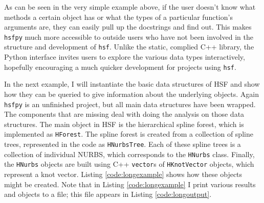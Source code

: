   \vspace{.2in}
  
  \mainstretch{}

  As can be seen in the very simple example above, if the user doesn't know what methods a certain object has or what the types of a particular function's arguments are, they can easily pull up the docstrings and find out. This makes \texttt{hsfpy} much more accessible to outside users who have not been involved in the structure and development of \texttt{hsf}. Unlike  the static, complied C++ library, the Python interface invites users to explore the various data types interactively, hopefully encouraging a much quicker development for projects using \texttt{hsf}.

  In the next example, I will instantiate the basic data structures of HSF and show how they can be queried to give information about the underlying objects. Again \texttt{hsfpy} is an unfinished project, but all main data structures have been wrapped. The components that are missing deal with doing the analysis on those data structures. The main object in HSF is the hierarchical spline forest, which is implemented as \texttt{HForest}. The spline forest is created from a collection of spline trees, represented in the code as \texttt{HNurbsTree}. Each of these spline trees is a collection of individual NURBS, which corresponds to the \texttt{HNurbs} class. Finally, the \texttt{HNurbs} objects are built using C++ \texttt{vector}s of \texttt{HKnotVector} objects, which represent a knot vector. Listing \ref{code:longexample} shows how these objects might be created. Note that in Listing \ref{code:longexample} I print various results and objects to a file; this file appears in Listing \ref{code:longoutput}.

  \vspace{.2in}
  
  \mainstretch{}

  \vspace{.2in}
  
  \mainstretch{}

